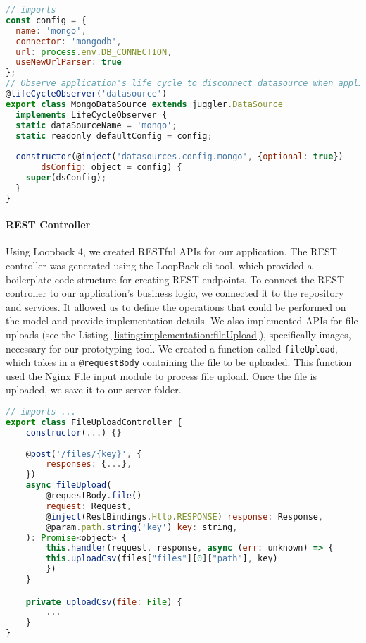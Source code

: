 \begin{lstlisting}[language=JavaScript, caption=lb-4-mongo.datasource.ts, label=listing:implementation:lb4Mongo]
// imports
const config = {
  name: 'mongo',
  connector: 'mongodb',
  url: process.env.DB_CONNECTION,
  useNewUrlParser: true
};
// Observe application's life cycle to disconnect datasource when application is stopped
@lifeCycleObserver('datasource')
export class MongoDataSource extends juggler.DataSource
  implements LifeCycleObserver {
  static dataSourceName = 'mongo';
  static readonly defaultConfig = config;
    
  constructor(@inject('datasources.config.mongo', {optional: true})
       dsConfig: object = config) {
    super(dsConfig);
  }
}
\end{lstlisting}

\paragraph{REST Controller}
Using Loopback 4, we created RESTful APIs for our application. 
The REST controller was generated using the LoopBack \ac{cli} tool, which provided a boilerplate code structure for creating REST endpoints.
To connect the REST controller to our application's business logic, we connected it to the repository and services. 
It allowed us to define the operations that could be performed on the model and provide implementation details.
We also implemented APIs for file uploads (see the Listing \ref{listing:implementation:fileUpload}), specifically images, necessary for our prototyping tool. 
We created a function called \texttt{fileUpload}, which takes in a \texttt{@requestBody} containing the file to be uploaded. 
This function used the Nginx File input module to process file upload. 
Once the file is uploaded, we save it to our server folder.

\begin{lstlisting}[language=JavaScript, caption=file-upload.controller.ts, label=listing:implementation:fileUpload]
// imports ...
export class FileUploadController {
    constructor(...) {}
    
    @post('/files/{key}', {
        responses: {...},
    })
    async fileUpload(
        @requestBody.file()
        request: Request,
        @inject(RestBindings.Http.RESPONSE) response: Response,
        @param.path.string('key') key: string,
    ): Promise<object> {
        this.handler(request, response, async (err: unknown) => {
        this.uploadCsv(files["files"][0]["path"], key)
        })
    }

    private uploadCsv(file: File) {
        ...
    }
}
\end{lstlisting}


